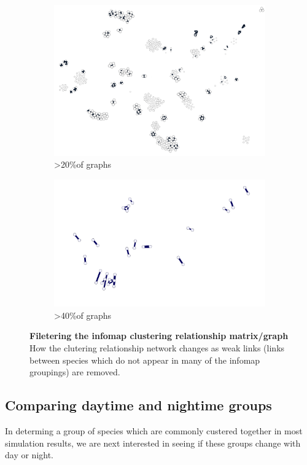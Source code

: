 \begin{figure}[H]
\begin{subfigure}[t]{.5\textwidth}
  \centering
  \includegraphics[width=\textwidth]{fig/c3.png}
  \caption{>20\%of graphs}
\end{subfigure}%
\begin{subfigure}[t]{.5\textwidth}
  \centering
  \includegraphics[width=\textwidth]{fig/c4.png}
  \caption{>40\%of graphs}
\end{subfigure}%
\caption{\textbf{Filetering the infomap clustering relationship matrix/graph} How the clutering relationship network changes as weak links (links between species which do not appear in many of the infomap groupings) are removed. }
\label{fig:infomapprune}
\end{figure}

\subsection{Comparing daytime and nightime groups}
In determing a group of species which are commonly custered together in most simulation results, we are next interested in seeing if these groups change with day or night. 

